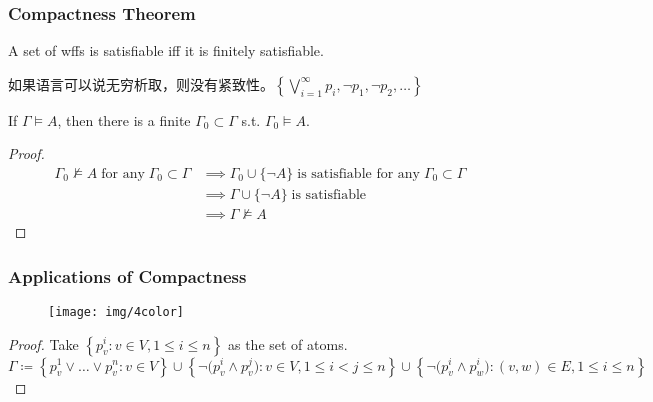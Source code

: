 \documentclass[UTF8,aspectratio=43,11pt,colorlinks,compress,openany]{beamer}%
\begin{document}
\begin{frame}\frametitle{Compactness Theorem}
\setlength\abovedisplayskip{0pt}
\setlength\belowdisplayskip{0pt}
	\begin{theorem}
		A set of wffs is satisfiable iff it is finitely satisfiable.
	\end{theorem}
	\begin{block}{}
	如果语言可以说无穷析取，则没有紧致性。$\left\{\bigvee\limits_{i=1}^\infty p_i,\neg p_1,\neg p_2,\dots\right\}$
	\end{block}
	\begin{corollary}
		If $\Gamma\vDash A$, then there is a finite $\Gamma_0\subset\Gamma$ s.t. $\Gamma_0\vDash A$.
	\end{corollary}
	\begin{proof}
		\begin{align*}
		\Gamma_0\nvDash A\;\text{for any}\;\Gamma_0\subset\Gamma&\implies\Gamma_0\cup\{\neg A\}\;\text{is satisfiable for any}\;\Gamma_0\subset\Gamma\\
		&\implies\Gamma\cup\{\neg A\}\;\text{is satisfiable}\\
		&\implies\Gamma\nvDash A
		\end{align*}
	\end{proof}
\end{frame}

\begin{frame}\frametitle{Applications of Compactness}
	\begin{figure}
	\texttt{[image: img/4color]}
	\end{figure}
	\begin{center}
	\end{center}
\begin{proof}
Take $\left\{p_v^i: v\in V, 1\leq i\leq n\right\}$ as the set of atoms.\\
$\Gamma\coloneqq \left\{p_v^1\vee\dots\vee p_v^n: v\in V\right\}\cup\left\{\neg\big(p_v^i\wedge p_v^j\big): v\in V, 1\leq i<j\leq n\right\}\cup\left\{\neg\big(p_v^i\wedge p_w^i\big): (v,w)\in E, 1\leq i\leq n\right\}$
\end{proof}
\end{frame}
\end{document}
